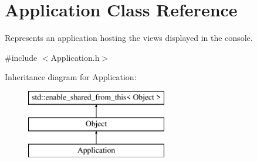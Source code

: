 \hypertarget{class_application}{}\section{Application Class Reference}
\label{class_application}


Represents an application hosting the views displayed in the console.  




{\ttfamily \#include $<$Application.\+h$>$}

Inheritance diagram for Application\+:\begin{figure}[H]
\begin{center}
\leavevmode
\includegraphics[height=3.000000cm]{class_application}
\end{center}
\end{figure}
